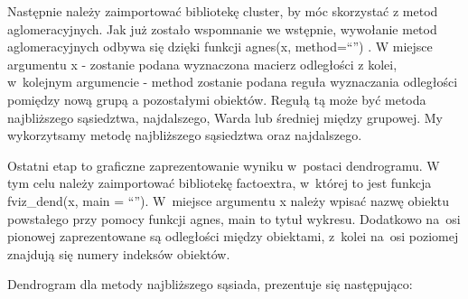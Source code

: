 \documentclass[12pt,a4paper]{report}
\begin{document}
{\begin{Shaded}
\begin{Highlighting}[]
\StringTok{ }\NormalTok{(dane_porzadkowanie[,}\NormalTok{(}\NormalTok{,}\NormalTok{,}
            \NormalTok{,}\NormalTok{,}\NormalTok{)],                                           } \NormalTok{)}
\end{Highlighting}
\end{Shaded}

Następnie należy zaimportować bibliotekę cluster, by móc skorzystać z
metod aglomeracyjnych. Jak już zostało wspomnanie we wstępnie, wywołanie
metod aglomeracyjnych odbywa się dzięki funkcji agnes(x, method=``'') .
W miejsce argumentu x - zostanie podana wyznaczona macierz odległości z
kolei, w~kolejnym argumencie - method zostanie podana reguła wyznaczania
odległości pomiędzy nową grupą a pozostałymi obiektów. Regułą tą może
być metoda najbliższego sąsiedztwa, najdalszego, Warda lub średniej
między grupowej. My wykorzytsamy metodę najbliższego sąsiedztwa oraz
najdalszego.

\begin{Shaded}
\begin{Highlighting}[]
\StringTok{ } \NormalTok{)}
\StringTok{ } \NormalTok{)}
\end{Highlighting}
\end{Shaded}

Ostatni etap to graficzne zaprezentowanie wyniku w~postaci dendrogramu.
W tym celu należy zaimportować bibliotekę factoextra, w~której to jest
funkcja fviz\_dend(x, main = ``''). W~miejsce argumentu x należy wpisać
nazwę obiektu powstałego przy pomocy funkcji agnes, main to tytuł
wykresu. Dodatkowo na~osi pionowej zaprezentowane są odległości między
obiektami, z~kolei na~osi poziomej znajdują się numery indeksów
obiektów.

Dendrogram dla metody najbliższego sąsiada, prezentuje się następująco:

\begin{Shaded}
\begin{Highlighting}[]
\NormalTok{, }\NormalTok{, }
 \NormalTok{)}
\end{Highlighting}
\end{Shaded}

}
\end{document}
